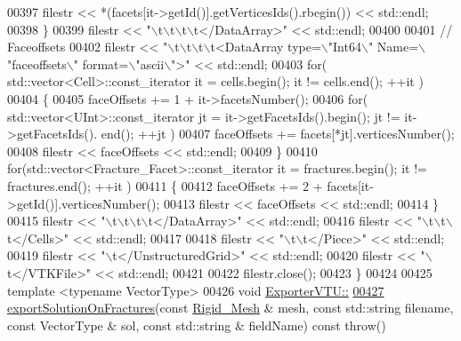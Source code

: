 \begin{DoxyCode}
00397         filestr << *(facets[it->getId()].getVerticesIds().rbegin()) << std::endl;
00398     \}
00399     filestr << \textcolor{stringliteral}{"\(\backslash\)t\(\backslash\)t\(\backslash\)t\(\backslash\)t</DataArray>"} << std::endl;
00400 
00401     \textcolor{comment}{//  Faceoffsets}
00402     filestr << \textcolor{stringliteral}{"\(\backslash\)t\(\backslash\)t\(\backslash\)t\(\backslash\)t<DataArray type=\(\backslash\)"Int64\(\backslash\)" Name=\(\backslash\)"faceoffsets\(\backslash\)" format=\(\backslash\)"ascii\(\backslash\)">"} << std::endl;
00403     \textcolor{keywordflow}{for}( std::vector<Cell>::const\_iterator it = cells.begin(); it != cells.end(); ++it )
00404     \{
00405         faceOffsets += 1 + it->facetsNumber();
00406         \textcolor{keywordflow}{for}( std::vector<UInt>::const\_iterator jt = it->getFacetsIds().begin(); jt != it->getFacetsIds().
      end(); ++jt )
00407             faceOffsets += facets[*jt].verticesNumber();
00408         filestr << faceOffsets << std::endl;
00409     \}
00410     \textcolor{keywordflow}{for}(std::vector<Fracture\_Facet>::const\_iterator it = fractures.begin(); it != fractures.end(); ++it )
00411     \{
00412         faceOffsets += 2 + facets[it->getId()].verticesNumber();
00413         filestr << faceOffsets << std::endl;
00414     \}
00415     filestr << \textcolor{stringliteral}{"\(\backslash\)t\(\backslash\)t\(\backslash\)t\(\backslash\)t</DataArray>"} << std::endl;
00416     filestr << \textcolor{stringliteral}{"\(\backslash\)t\(\backslash\)t\(\backslash\)t</Cells>"} << std::endl;
00417 
00418     filestr << \textcolor{stringliteral}{"\(\backslash\)t\(\backslash\)t</Piece>"} << std::endl;
00419     filestr << \textcolor{stringliteral}{"\(\backslash\)t</UnstructuredGrid>"} << std::endl;
00420     filestr << \textcolor{stringliteral}{"\(\backslash\)t</VTKFile>"} << std::endl;
00421 
00422     filestr.close();
00423 \}
00424 
00425 \textcolor{keyword}{template} <\textcolor{keyword}{typename} VectorType>
00426 \textcolor{keywordtype}{void} \hyperlink{classFVCode3D_1_1ExporterVTU_abc88a5113c02b55942862ef39b30ec80}{ExporterVTU::}
\hypertarget{ExportVTU_8hpp_source.tex_l00427}{}\hyperlink{classFVCode3D_1_1ExporterVTU_a2ebc29ace371341054f8780eba24d644}{00427} \hyperlink{classFVCode3D_1_1ExporterVTU_abc88a5113c02b55942862ef39b30ec80}{exportSolutionOnFractures}(\textcolor{keyword}{const} \hyperlink{classFVCode3D_1_1Rigid__Mesh}{Rigid\_Mesh} & mesh, \textcolor{keyword}{const} std::string 
      filename, \textcolor{keyword}{const} VectorType & sol, \textcolor{keyword}{const} std::string & fieldName) \textcolor{keyword}{const} \textcolor{keywordflow}{throw}()

\end{DoxyCode}
